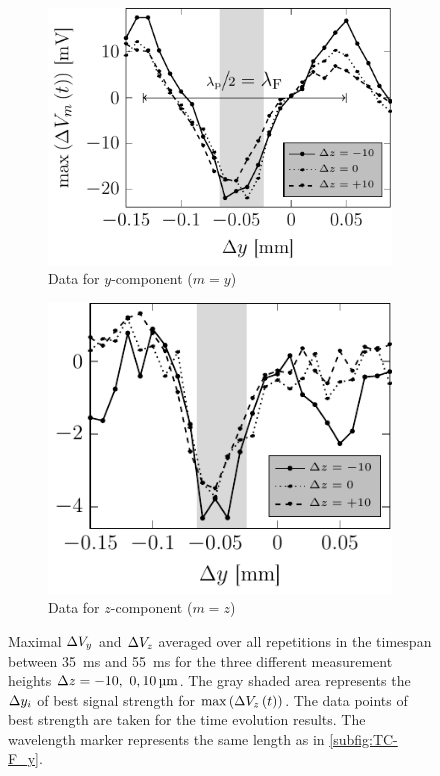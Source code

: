 \begin{figure}[ht]
  \centering
  \begin{subfigure}{\figWidth}
    \centering
    \caption{Data for $y$-component ($m = y$)}\label{subfig:TC-res_DV_y}
    \includegraphics[]{Plots/cache/avgV_y_vs_dy.pdf}
  \end{subfigure}%
  \begin{subfigure}{\figWidth}
    \centering
    \caption{Data for $z$-component ($m = z$)}\label{subfig:TC-res_DV_z}
    \includegraphics[]{Plots/cache/avgV_z_vs_dy.pdf}
  \end{subfigure}%
  \caption{Maximal $\Delta V_{y}$ and $\Delta V_{z}$ averaged over all repetitions in the 
    timespan between \SI{35}{\ms} and \SI{55}{\ms} for the three different 
    measurement heights $\Dz = \SIlist[list-units=single, list-final-separator 
    = {, }, list-pair-separator= {, }] {-10;0;10}{\um}$. The gray shaded area 
    represents the $\Delta y_{i}$ of best signal strength for $\max\left( 
    \Delta V_{z}\left( t \right) \right)$. The data points of best strength are 
    taken for the time evolution results. The wavelength marker represents the 
  same length as in \cref{subfig:TC-F_y}.}\label{fig:TC-DV_vs_dy}
\end{figure}%

